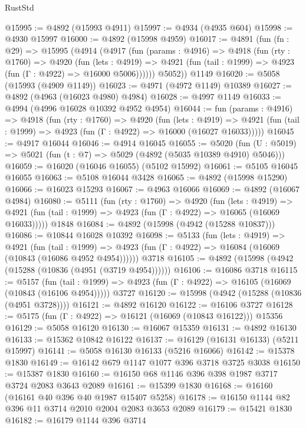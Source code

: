 \begin{lexlean}{RustStd}
\begin{coremodule}
@15995 := @4892 (@15993 @4911)
@15997 := @4934 (@4935 @604)
@15998 := @4930 @15997
@16000 := @4892 (@15998 @4959)
@16017 := @4891
    (fun (fn : @29) =>
    @15995
      (@4914
        (@4917
          (fun (params : @4916) =>
          @4918
            (fun (rty : @1760) =>
            @4920
              (fun (lets : @4919) =>
              @4921 (fun (tail : @1999) => @4923 (fun (Γ : @4922) => @16000 @5006))))))
        @5052))
    @1149
@16020 := @5058 (@15993 (@4909 @1149))
@16023 := @4971 (@4972 @1149) @10389
@16027 := @4892 (@4963 (@16023 @4980) @4984)
@16028 := @4997 @1149
@16033 := @4994 (@4996 @16028 @10392 @4952 @4954)
@16044 := fun (params : @4916) =>
  @4918
    (fun (rty : @1760) =>
    @4920
      (fun (lets : @4919) =>
      @4921 (fun (tail : @1999) => @4923 (fun (Γ : @4922) => @16000 (@16027 @16033)))))
@16045 := @4917 @16044
@16046 := @4914 @16045
@16055 := @5020
    (fun (U : @5019) => @5021 (fun (t : @7) => @5029 (@4892 (@5035 @10389 @4910) @5046)))
@16059 := @16020 (@16046 @16055) (@5102 @15992)
@16061 := @5105 @16045 @16055
@16063 := @5108 @16044 @3428
@16065 := @4892 (@15998 @15290)
@16066 := @16023 @15293
@16067 := @4963 @16066
@16069 := @4892 (@16067 @4984)
@16080 := @5111
    (fun (rty : @1760) =>
    @4920
      (fun (lets : @4919) =>
      @4921 (fun (tail : @1999) => @4923 (fun (Γ : @4922) => @16065 (@16069 @16033)))))
    @1848
@16084 := @4892 (@15998 (@4942 (@15288 @10837)))
@16086 := @10844 @16028 @10392
@16098 := @5133
    (fun (lets : @4919) =>
    @4921
      (fun (tail : @1999) =>
      @4923 (fun (Γ : @4922) => @16084 (@16069 (@10843 (@16086 @4952 @4954))))))
    @3718
@16105 := @4892 (@15998 (@4942 (@15288 (@10836 (@4951 (@3719 @4954))))))
@16106 := @16086 @3718
@16115 := @5157
    (fun (tail : @1999) => @4923 (fun (Γ : @4922) => @16105 (@16069 (@10843 (@16106 @4954)))))
    @3727
@16120 := @15998 (@4942 (@15288 (@10836 (@4951 @3728))))
@16121 := @4892 @16120
@16122 := @16106 @3727
@16128 := @5175 (fun (Γ : @4922) => @16121 (@16069 (@10843 @16122))) @15356
@16129 := @5058 @16120
@16130 := @16067 @15359
@16131 := @4892 @16130
@16133 := @15362 @10842 @16122
@16137 := @16129 (@16131 @16133) (@5211 @15997)
@16141 := @5058 @16130 @16133 (@5216 @16066)
@16142 := @15378 @1830
@16149 := @16142 @679 @1147 @1077 @396 @3718 @3725 @3038
@16150 := @15387 @1830
@16160 := @16150 @68 @1146 @396 @398 @1987 @3717 @3724 @2083 @3643 @2089
@16161 := @15399 @1830
@16168 := @16160 (@16161 @40 @396 @40 @1987 @15407 @5258)
@16178 := @16150 @1144 @82 @396 @11 @3714 @2010 @2004 @2083 @3653 @2089
@16179 := @15421 @1830
@16182 := @16179 @1144 @396 @3714

\end{coremodule}
\end{lexlean}
